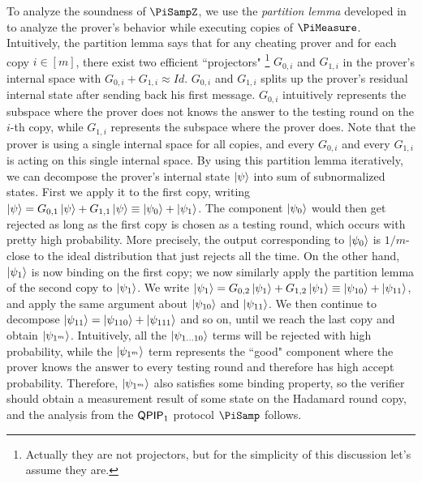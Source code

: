 
To analyze the soundness of $\PiSampZ$, we use the \emph{partition lemma} developed in~\cite{arXiv:ChiaChungYam19} to analyze the prover's behavior while executing copies of $\PiMeasure$. Intuitively, the partition lemma says that for any cheating prover and for each copy $i\in[m]$, there exist two efficient ``projectors" \footnote{Actually they are not projectors, but for the simplicity of this discussion let's assume they are.} $G_{0,i}$ and $G_{1,i}$ in the prover's internal space with $G_{0,i}+G_{1,i} \approx Id$. $G_{0,i}$ and $G_{1,i}$ splits up the prover's residual internal state after sending back his first message.
$G_{0,i}$ intuitively represents the subspace where the prover does not knows the answer to the testing round on the $i$-th copy, while $G_{1,i}$ represents the subspace where the prover does. Note that the prover is using a single internal space for all copies, and every $G_{0,i}$ and every $G_{1,i}$ is acting on this single internal space. 
By using this partition lemma iteratively, we can decompose the prover's internal state $\ket{\psi}$ into sum of subnormalized states.
First we apply it to the first copy, writing $\ket{\psi}=G_{0,1}\ket{\psi}+G_{1,1}\ket{\psi} \equiv \ket{\psi_0}+\ket{\psi_1}$.
The component $\ket{\psi_0}$ would then get rejected as long as the first copy is chosen as a testing round,
which occurs with pretty high probability.
More precisely, the output corresponding to $\ket{\psi_0}$ is $1/m$-close to the ideal distribution that just rejects all the time.
On the other hand, $\ket{\psi_1}$ is now binding on the first copy;
we now similarly apply the partition lemma of the second copy to $\ket{\psi_1}$.
We write $\ket{\psi_1}=G_{0,2}\ket{\psi_1}+G_{1,2}\ket{\psi_1}\equiv \ket{\psi_{10}}+\ket{\psi_{11}}$, and apply the same argument about $\ket{\psi_{10}}$ and $\ket{\psi_{11}}$.
We then continue to decompose $\ket{\psi_{11}}=\ket{\psi_{110}}+\ket{\psi_{111}}$ and so on, until we reach the last copy and obtain $\ket{\psi_{1^m}}$.
Intuitively, all the $\ket{\psi_{1\dots10}}$ terms will be rejected with high probability, while the $\ket{\psi_{1^m}}$ term represents the ``good" component where the prover knows the answer to every testing round and therefore has high accept probability. Therefore, $\ket{\psi_{1^m}}$ also satisfies some binding property,
so the verifier should obtain a measurement result of some state on the Hadamard round copy,
and the analysis from the $\operatorname{\mathsf{QPIP}}_1$ protocol $\PiSamp$ follows.


